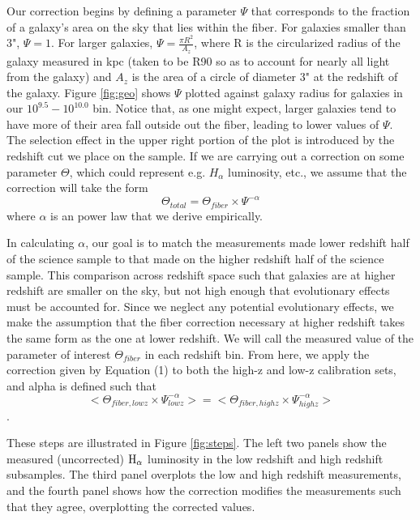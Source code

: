 \documentclass[iop]{emulateapj}
\begin{document}
Our correction begins by defining a parameter $\Psi$ that corresponds to the fraction of a galaxy's area on the sky that lies within the fiber. For galaxies smaller than 3", $\Psi = 1$. For larger galaxies, $\Psi = \frac{\pi R^2}{A_z}$, where R is the circularized radius of the galaxy measured in kpc (taken to be R90 so as to account for nearly all light from the galaxy) and $A_z$ is the area of a circle of diameter 3" at the redshift of the galaxy. Figure \ref{fig:geo} shows $\Psi$ plotted against galaxy radius for galaxies in our $10^{9.5}-10^{10.0}$ bin. Notice that, as one might expect, larger galaxies tend to have more of their area fall outside out the fiber, leading to lower values of $\Psi$. The selection effect in the upper right portion of the plot is introduced by the redshift cut we place on the sample. If we are carrying out a correction on some parameter $\Theta$, which could represent e.g. $H_{\alpha}$ luminosity, etc., we assume that the correction will take the form $$\Theta_{total} = \Theta_{fiber} \times \Psi^{-\alpha}$$ where $\alpha$ is an power law that we derive empirically.

In calculating $\alpha$, our goal is to match the measurements made lower redshift half of the science sample to that made on the higher redshift half of the science sample. This comparison across redshift space such that galaxies are at higher redshift are smaller on the sky, but not high enough that evolutionary effects must be accounted for. Since we neglect any potential evolutionary effects, we make the assumption that the fiber correction necessary at higher redshift takes the same form as the one at lower redshift. We will call the measured value of the parameter of interest $\Theta_{fiber}$ in each redshift bin. From here, we apply the correction given by Equation (1) to both the high-z and low-z calibration sets, and alpha is defined such that $$<\Theta_{fiber,lowz} \times \Psi_{lowz}^{-\alpha}> = <\Theta_{fiber,highz} \times \Psi_{highz}^{-\alpha}>$$.

These steps are illustrated in Figure \ref{fig:steps}. The left two panels show the measured (uncorrected) $\rm H_{\alpha}$ luminosity in the low redshift and high redshift subsamples. The third panel overplots the low and high redshift measurements, and the fourth panel shows how the correction modifies the measurements such that they agree, overplotting the corrected values. 
\end{document}
